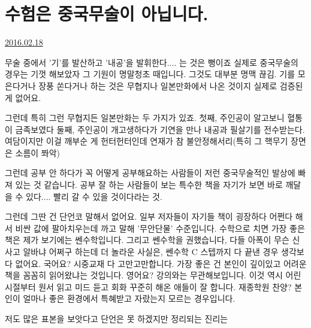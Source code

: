 \section{수험은 중국무술이 아닙니다.}
\href{https://www.kockoc.com/Apoc/640886}{2016.02.18}

\vspace{5mm}

무술 중에서 '기'를 발산하고 '내공'을 발휘한다.... 는 것은 뻥이죠
실제로 중국무술의 경우는 기껏 해보았자 그 기원이 명말청초 때입니다. 그것도 대부분 명맥 끊김.
기를 모은다거나 장풍 쏜다거나 하는 것은 무협지나 일본만화에서 나온 것이지 실제로 검증된 게 없어요.
\vspace{5mm}

그런데 특히 그런 무협지든 일본만화는 두 가지가 있죠.
첫째, 주인공이 알고보니 혈통이 금족보였다
둘째, 주인공이 개고생하다가 기연을 만나 내공과 필살기를 전수받는다.
여담이지만 이걸 깨부순 게 헌터헌터인데 연재가 참 불안정해서리(특히 그 핵무기 장면은 소름이 쫘악)
\vspace{5mm}

그런데 공부 안 하다가 꼭 어떻게 공부해요하는 사람들이 저런 중국무술적인 발상에 빠져 있는 것 같습니다.
공부 잘 하는 사람들이 보는 특수한 책을 자기가 보면 바로 깨달을 수 있다.... 빨리 갈 수 있을 것이다라는 것.
\vspace{5mm}

그런데 그딴 건 단언코 말해서 없어요.
일부 저자들이 자기들 책이 굉장하다 어쩐다 해서 비싼 값에 팔아치우는데 까고 말해 '무안단물' 수준입니다.
수학으로 치면 가장 좋은 책은 제가 보기에는 쎈수학입니다. 그리고 쎈수학을 권했습니다,
다들 아폭이 무슨 신사고 알바냐 어쩌구 하는데 더 놀라운 사실은, 쎈수학 C 스텝까지 다 끝낸 경우 생각보다 없어요.
국어요? 시중교재 다 고만고만합니다. 가장 좋은 건 본인이 깊이있고 어려운 책을 꼼꼼히 읽어왔냐는 것입니다.
영어요? 강의와는 무관해보입니다. 이것 역시 어린 시절부터 원서 읽고 미드 듣고 회화 꾸준히 해온 애들이 잘 합니다.
재종학원 찬양? 본인이 얼마나 좋은 환경에서 특혜받고 자랐는지 모르는 경우입니다.
\vspace{5mm}

저도 많은 표본을 보앗다고 단언은 못 하겠지만 정리되는 진리는
\vspace{5mm}


